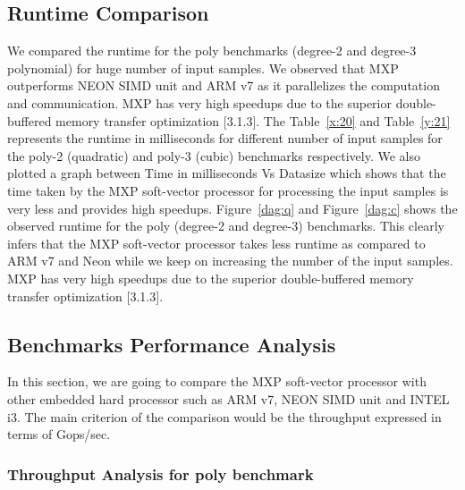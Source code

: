 \subsection{Runtime Comparison}
We compared the runtime for the poly benchmarks (degree-2 and degree-3 polynomial) for huge number of input samples. We observed that MXP outperforms NEON SIMD unit and ARM v7 as it parallelizes the computation and communication. MXP has very high speedups due to the superior double-buffered memory transfer optimization [3.1.3]. The Table~\ref{x:20} and Table~\ref{y:21} represents the runtime in milliseconds for different number of input samples for the poly-2 (quadratic) and poly-3 (cubic) benchmarks respectively. We also plotted a graph between Time in milliseconds Vs Datasize which shows that the time taken by the MXP soft-vector processor for processing the input samples is very less and provides high speedups. Figure~\ref{dag:q} and Figure~\ref{dag:c} shows the observed runtime for the poly (degree-2 and degree-3) benchmarks. This clearly infers that the MXP soft-vector processor takes less runtime as compared to ARM v7 and Neon while we keep on increasing the number of the input samples. MXP has very high speedups due to the superior double-buffered memory transfer optimization [3.1.3].












\subsection{Benchmarks Performance Analysis}
In this section, we are going to compare the MXP soft-vector processor with other embedded hard processor such as ARM v7, NEON SIMD unit and INTEL i3. The main criterion of the comparison would be the throughput expressed in terms of Gops/sec.

\subsubsection{Throughput Analysis for poly benchmark}

